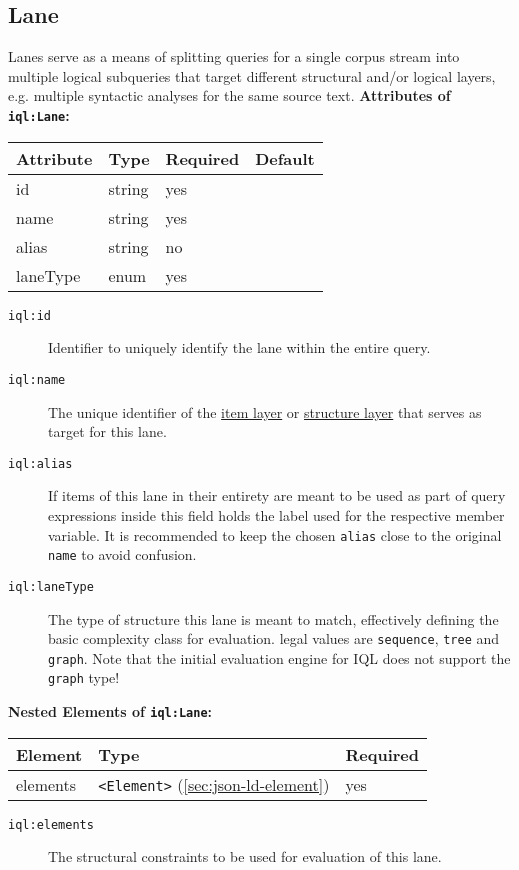 \documentclass[11pt,a4paper,portrait]{article}
\newcommand{\iql}{IQL\xspace}
\newcommand{\iqlns}{iql:}
\newcommand{\repoUrl}{https://github.com/ICARUS-tooling/icarus2-modeling-framework/blob/dev/}
\newcommand{\modelsUrl}{\repoUrl icarus2-model-api/src/main/java/de/ims/icarus2/model/api/}
\newcommand{\repoLink}[2]{\href{#1}{#2}}
\newcommand{\iqlType}[1]{\texttt{\iqlns#1}}
\newcommand{\iqlBaseType}[1]{\texttt{\textless#1\textgreater}}
\newcommand{\desc}[1]{\noindent#1\newline\medskip}
\newenvironment{attributes}[1]{
\noindent\textbf{Attributes of #1:}\newline\medskip
\begin{tabular}{|p{0.3\textwidth}|p{0.20\textwidth}|p{0.20\textwidth}|p{0.17\textwidth}|}
	\hline
	\textbf{Attribute} & \textbf{Type} & \textbf{Required} & \textbf{Default} \\ 
	\hline
	\hline
}{
\end{tabular}
}
\newcommand{\attribute}[4]{
	#1 & #2 & #3 & #4 \\
	\hline
}
\newenvironment{elements}[1]{
\noindent\textbf{Nested Elements of #1:}\newline\medskip
\begin{tabular}{|p{0.3\textwidth}|p{0.42\textwidth}|p{0.17\textwidth}|}
	\hline
	\textbf{Element} & \textbf{Type} & \textbf{Required} \\ 
	\hline
	\hline
}{
\end{tabular}
}
\newcommand{\element}[3]{
#1 & #2 & #3 \\
\hline
}
\begin{document}
\subsection{Lane}
\label{sec:json-ld-lane}
\desc{Lanes serve as a means of splitting queries for a single corpus stream into multiple logical subqueries that target different structural and/or logical layers, e.g. multiple syntactic analyses for the same source text.}
\begin{attributes}{\iqlType{Lane}}
	\attribute{id}{string}{yes}{}
	\attribute{name}{string}{yes}{}
	\attribute{alias}{string}{no}{}
	\attribute{laneType}{enum}{yes}{}
\end{attributes}
\begin{description}
	\item[\iqlType{id}] Identifier to uniquely identify the lane within the entire query.
	\item[\iqlType{name}] The unique identifier of the \repoLink{\modelsUrl layer/ItemLayer.java}{item layer} or \repoLink{\modelsUrl layer/StructureLayer.java}{structure layer} that serves as target for this lane.
	\item[\iqlType{alias}] If items of this lane in their entirety are meant to be used as part of query expressions inside this field holds the label used for the respective member variable. It is recommended to keep the chosen \texttt{alias} close to the original \texttt{name} to avoid confusion.
	\item[\iqlType{laneType}] The type of structure this lane is meant to match, effectively defining the basic complexity class for evaluation. legal values are \texttt{sequence}, \texttt{tree} and \texttt{graph}. Note that the initial evaluation engine for \iql does not support the \texttt{graph} type! %
\end{description}
\begin{elements}{\iqlType{Lane}}
	\element{elements}{\iqlBaseType{Element} (\ref{sec:json-ld-element})}{yes}
\end{elements}
\begin{description}
	\item[\iqlType{elements}] The structural constraints to be used for evaluation of this lane.
\end{description}
\end{document}
